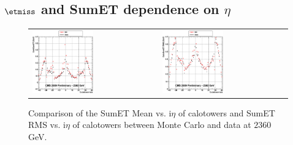 \clearpage

\subsection{$\etmiss$ and SumET dependence on $\eta$}

\begin{figure}[h!]
 \centering
 \begin{tabular}{ll}
  \includegraphics[width=0.5\textwidth]{plots_DataVsMC_MB_2360GeV/g_caloSumetMean_vs_ieta_2360.eps} &
  \includegraphics[width=0.5\textwidth]{plots_DataVsMC_MB_2360GeV/g_caloSumetRMS_vs_ieta_2360.eps} \\
 \end{tabular}
 \caption{\small Comparison of the SumET Mean vs. i$\eta$ of calotowers and SumET RMS vs. i$\eta$ of calotowers between 
          Monte Carlo and data at $2360$ GeV.\label{fig:SumET_MeanRMS_vs_ieta_2360}}
\end{figure}

